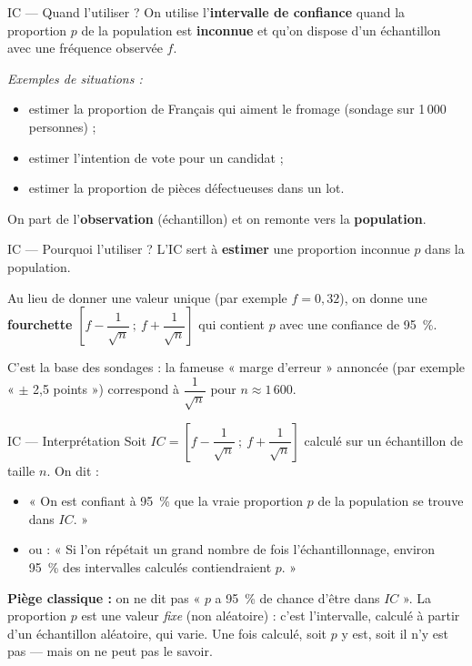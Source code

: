 \documentclass[11pt,a4paper]{article}
\newcommand{\IC}{\textit{IC}}
\begin{document}
	\begin{ficheoutils}{IC — Quand l'utiliser ?}
		On utilise l'\textbf{intervalle de confiance} quand la proportion $p$ de la
		population est \textbf{inconnue} et qu'on dispose d'un échantillon avec une
		fréquence observée $f$.
		
		\emph{Exemples de situations :}
		\begin{itemize}
			\item estimer la proportion de Français qui aiment le fromage (sondage sur
			1\,000 personnes) ;
			\item estimer l'intention de vote pour un candidat ;
			\item estimer la proportion de pièces défectueuses dans un lot.
		\end{itemize}
		On part de l'\textbf{observation} (échantillon) et on remonte vers la
		\textbf{population}.
	\end{ficheoutils}
	
	\begin{ficheoutils}{IC — Pourquoi l'utiliser ?}
		L'IC sert à \textbf{estimer} une proportion inconnue $p$ dans la population.
		
		Au lieu de donner une valeur unique (par exemple $f = 0{,}32$), on donne une
		\textbf{fourchette}
		$\left[f - \dfrac{1}{\sqrt{n}}\ ;\ f + \dfrac{1}{\sqrt{n}}\right]$ qui contient
		$p$ avec une confiance de 95~\%.
		
		C'est la base des sondages : la fameuse « marge d'erreur » annoncée (par exemple
		« $\pm$ 2,5 points ») correspond à $\dfrac{1}{\sqrt{n}}$ pour
		$n \approx 1\,600$.
	\end{ficheoutils}
	
	\begin{ficheoutils}{IC — Interprétation}
		Soit $\IC{} = \left[f - \dfrac{1}{\sqrt{n}}\ ;\ f + \dfrac{1}{\sqrt{n}}\right]$
		calculé sur un échantillon de taille $n$. On dit :
		\begin{itemize}
			\item « On est confiant à 95~\% que la vraie proportion $p$ de la population
			se trouve dans $\IC{}$. »
			\item ou : « Si l'on répétait un grand nombre de fois l'échantillonnage,
			environ 95~\% des intervalles calculés contiendraient $p$. »
		\end{itemize}
		\begin{notebox}
			\textbf{Piège classique :} on ne dit pas « $p$ a 95~\% de chance d'être dans
			$\IC{}$ ». La proportion $p$ est une valeur \emph{fixe} (non aléatoire) : c'est
			l'intervalle, calculé à partir d'un échantillon aléatoire, qui varie. Une fois
			calculé, soit $p$ y est, soit il n'y est pas — mais on ne peut pas le savoir.
		\end{notebox}
	\end{ficheoutils}
	
\end{document}
